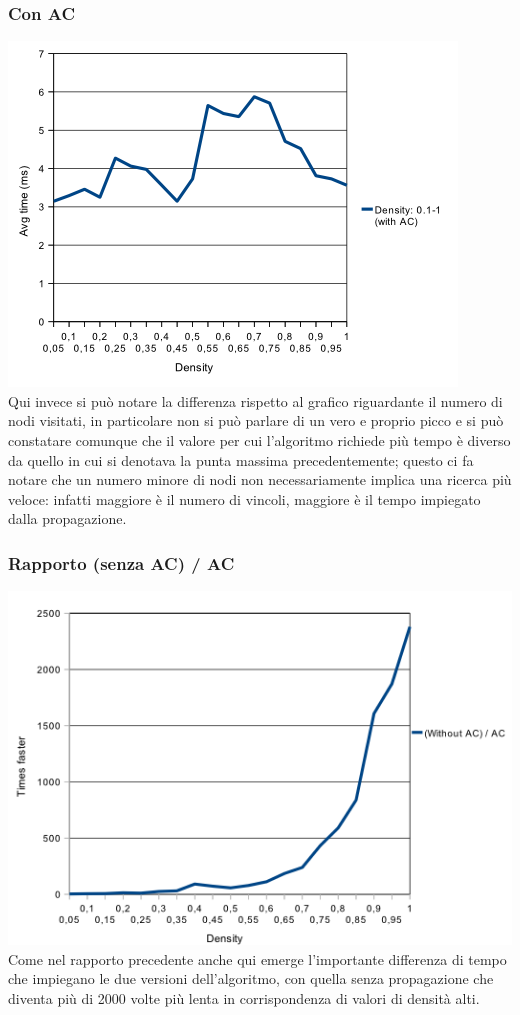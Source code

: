 \documentclass[a4paper,12pt,italian]{article}
\begin{document}
\subsubsection{Con AC}
\includegraphics[scale=0.8]{densACTime.png}
\\
Qui invece si pu\`o notare la differenza rispetto al grafico
riguardante il numero di nodi visitati, in particolare
non si pu\`o parlare di un vero e proprio picco e si pu\`o constatare comunque che il valore
per cui l'algoritmo richiede pi\`u tempo \`e diverso da quello in cui si denotava la punta massima 
precedentemente; questo ci fa notare che un numero minore di nodi non necessariamente implica una 
ricerca pi\`u veloce: infatti maggiore \`e il numero di vincoli,
maggiore \`e il tempo impiegato dalla propagazione.

\subsubsection{Rapporto (senza AC) / AC}
\includegraphics[scale=0.8]{densTimeQuotient.png}
\\
Come nel rapporto precedente anche qui emerge l'importante differenza di tempo che impiegano le
due versioni dell'algoritmo, con quella senza propagazione che diventa pi\`u di 2000 volte pi\`u lenta
in corrispondenza di valori di densit\`a alti.
\end{document}
